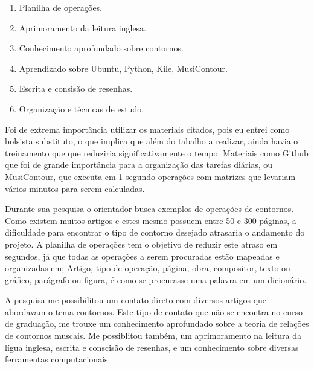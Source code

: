 \documentclass[11pt]{article}
\begin{document}
\begin{enumerate}
\item Planilha de operações.
\item Aprimoramento da leitura inglesa.
\item Conhecimento aprofundado sobre contornos.
\item Aprendizado sobre Ubuntu, Python, Kile, MusiContour.
\item Escrita e consisão de resenhas.
\item Organização e técnicas de estudo.
\end{enumerate}


\label{sec:discussao}

Foi de extrema importância utilizar os materiais citados, pois eu entrei como bolsista
substituto, o que implica que além do tabalho a realizar, ainda havia o treinamento que
que reduziria significativamente o tempo. Materiais como Github que foi de grande importância
para a organização das tarefas diárias, ou MusiContour, que executa em 1 segundo operações
com matrizes que levariam vários minutos para serem calculadas.

Durante sua pesquisa o orientador busca exemplos de operações de contornos. Como existem
muitos artigos e estes mesmo possuem entre 50 e 300 páginas, a dificuldade para encontrar
o tipo de contorno desejado atrasaria o andamento do projeto. A planilha de operações tem o
objetivo de reduzir este atraso em segundos, já que todas as operações a serem procuradas
estão mapeadas e organizadas em; Artigo, tipo de operação, página, obra, compositor, texto ou gráfico,
parágrafo ou figura, é como se procurasse uma palavra em um dicionário.

A pesquisa me possibilitou um contato direto com diversos artigos que abordavam
o tema contornos. Este tipo de contato que não se encontra no curso de graduação,
me trouxe um conhecimento aprofundado sobre a teoria de relações de contornos muscais.
Me possiblitou também, um aprimoramento na leitura da lígua inglesa, escrita e conscisão
de resenhas, e um conhecimento sobre diversas ferramentas computacionais.
\end{document}
